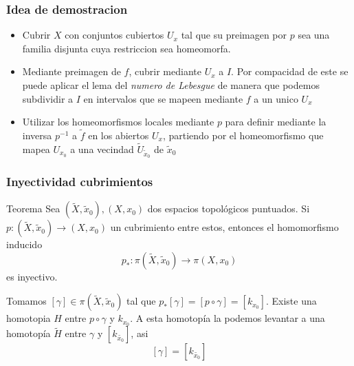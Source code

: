\documentclass[xetex,mathserif,serif]{beamer}
\begin{document}
  \begin{frame}
    \frametitle{Idea de demostracion}
    \begin{itemize}
    \item Cubrir \(X\) con conjuntos cubiertos \(U_x\) tal que su
      preimagen por \(p\) sea una familia disjunta cuya restriccion sea
      homeomorfa.
    \item Mediante preimagen de \(f\), cubrir mediante \(U_x\) a \(I\).
      Por compacidad de este se puede aplicar el lema del \emph{numero
        de Lebesgue} de manera que podemos subdividir a \(I\) en
      intervalos que se mapeen mediante \(f\) a un unico \(U_x\)
    \item Utilizar los homeomorfismos locales mediante \(p\) para
      definir mediante la inversa \(p^{-1}\) a \(\tilde f\) en los
      abiertos \(U_x\), partiendo por el homeomorfismo que mapea
      \(U_{x_0}\) a una vecindad \(\tilde U _{\tilde x_0}\) de \(\tilde
      x_0\)
    \end{itemize}
  \end{frame}
  \begin{frame}
    \frametitle{Inyectividad cubrimientos}
    \begin{block}{Teorema}
      Sea \(\left( \tilde X, \tilde x_0 \right), \left( X, x_0 \right)\)
      dos espacios topológicos puntuados. Si \(p : \left( \tilde X,
        \tilde x_0 \right) \to \left( X, x_0 \right)\) un cubrimiento
      entre estos, entonces el homomorfismo inducido
      \[ p_* : \pi \left( \tilde X, \tilde x_0 \right) \longrightarrow
        \pi \left( X, x_0 \right)\] es inyectivo.
    \end{block}
    \pause
    \begin{block}{}
      Tomamos \([\gamma] \in \pi(\tilde X, \tilde x_0)\) tal que \(p_*
      [\gamma] = [p \circ \gamma] = [k_{x_0}]\). Existe una homotopia
      \(H\) entre \(p \circ \gamma\) y \(k_{x_0}\). A esta homotopía la
      podemos levantar a una homotopía \(\tilde H\) entre \(\gamma\) y
      \([k_{\tilde {x_0}}]\), asi
      \[ [\gamma]= [k_{\tilde {x_0}}]\]
    \end{block}
  \end{frame}
\end{document}
